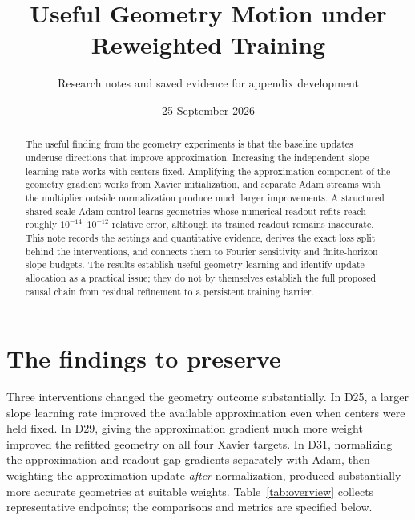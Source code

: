 \documentclass[11pt]{article}
\title{Useful Geometry Motion under Reweighted Training}
\author{Research notes and saved evidence for appendix development}
\date{25 September 2026}
\begin{document}
\maketitle
\begin{abstract}
The useful finding from the geometry experiments is that the baseline updates underuse directions that improve approximation. Increasing the independent slope learning rate works with centers fixed. Amplifying the approximation component of the geometry gradient works from Xavier initialization, and separate Adam streams with the multiplier outside normalization produce much larger improvements. A structured shared-scale Adam control learns geometries whose numerical readout refits reach roughly $10^{-14}$--$10^{-12}$ relative error, although its trained readout remains inaccurate. This note records the settings and quantitative evidence, derives the exact loss split behind the interventions, and connects them to Fourier sensitivity and finite-horizon slope budgets. The results establish useful geometry learning and identify update allocation as a practical issue; they do not by themselves establish the full proposed causal chain from residual refinement to a persistent training barrier.
\end{abstract}

\section{The findings to preserve}

Three interventions changed the geometry outcome substantially. In D25, a larger slope learning rate improved the available approximation even when centers were held fixed. In D29, giving the approximation gradient much more weight improved the refitted geometry on all four Xavier targets. In D31, normalizing the approximation and readout-gap gradients separately with Adam, then weighting the approximation update \emph{after} normalization, produced substantially more accurate geometries at suitable weights. Table~\ref{tab:overview} collects representative endpoints; the comparisons and metrics are specified below.
\end{document}
